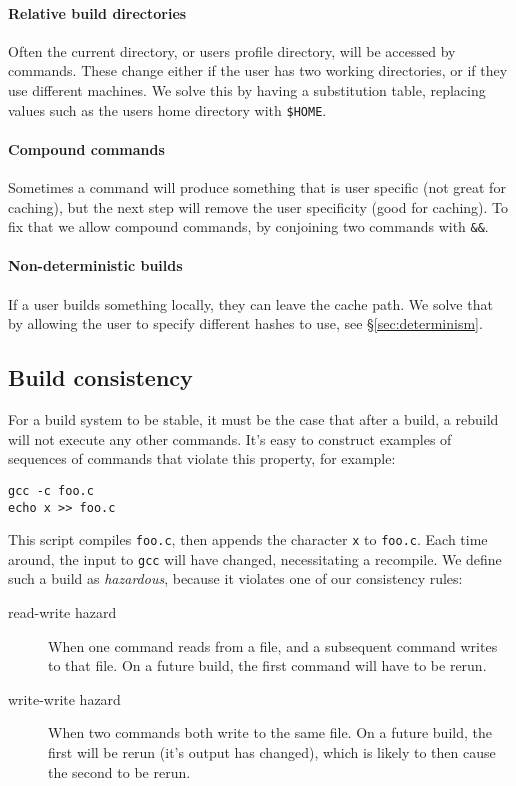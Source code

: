 \paragraph{Relative build directories} Often the current directory, or users profile directory, will be accessed by commands. These change either if the user has two working directories, or if they use different machines. We solve this by having a substitution table, replacing values such as the users home directory with \texttt{\$HOME}.

\paragraph{Compound commands} Sometimes a command will produce something that is user specific (not great for caching), but the next step will remove the user specificity (good for caching). To fix that we allow compound commands, by conjoining two commands with \texttt{\&\&}.

\paragraph{Non-deterministic builds} If a user builds something locally, they can leave the cache path. We solve that by allowing the user to specify different hashes to use, see \S\ref{sec:determinism}.

\subsection{Build consistency}

For a \Make build system to be stable, it must be the case that after a build, a rebuild will not execute any other commands. It's easy to construct examples of sequences of commands that violate this property, for example:

\begin{verbatim}
gcc -c foo.c
echo x >> foo.c
\end{verbatim}

This script compiles \texttt{foo.c}, then appends the character \texttt{x} to \texttt{foo.c}. Each time around, the input to \texttt{gcc} will have changed, necessitating a recompile. We define such a build as \emph{hazardous}, because it violates one of our consistency rules:

\begin{description}
\item[read-write hazard] When one command reads from a file, and a subsequent command writes to that file. On a future build, the first command will have to be rerun.
\item[write-write hazard] When two commands both write to the same file. On a future build, the first will be rerun (it's output has changed), which is likely to then cause the second to be rerun.
\end{description}


